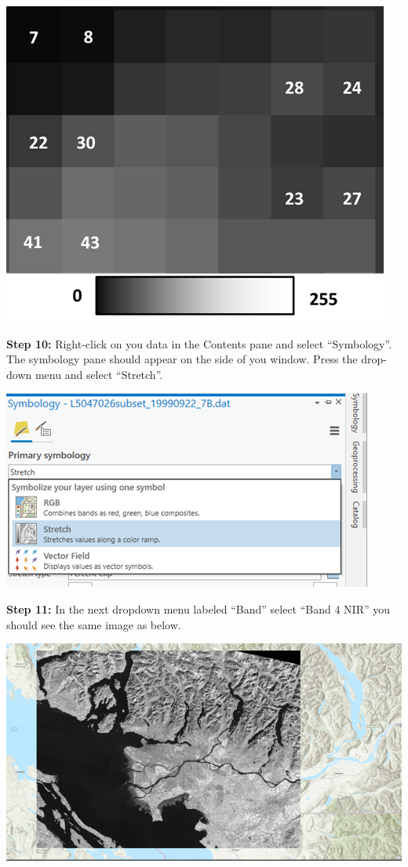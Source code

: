 \documentclass[
]{book}
\begin{document}
\begin{center}\includegraphics[width=0.5\linewidth]{images/01-grey-scale} \end{center}

\textbf{Step 10:} Right-click on you data in the Contents pane and select ``Symbology''. The symbology pane should appear on the side of you window. Press the drop-down menu and select ``Stretch''.

\begin{center}\includegraphics[width=0.5\linewidth]{images/01-symbology-stretch} \end{center}

\textbf{Step 11:} In the next dropdown menu labeled ``Band'' select ``Band 4 NIR'' you should see the same image as below.

\begin{center}\includegraphics[width=1\linewidth]{images/01-band-4-nir} \end{center}
\end{document}
